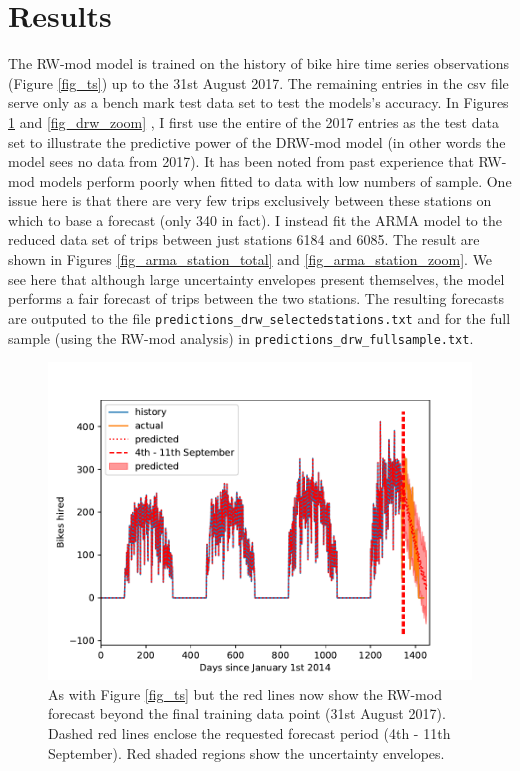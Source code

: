 \documentclass[10pt]{article}
\begin{document}
\section{Results}
\label{sec_results}
The RW-mod model is trained on the history of bike hire time series observations (Figure \ref{fig_ts}) up to the 31st August 2017. The remaining entries in the csv file serve only as a bench mark test data set to test the models's accuracy. In Figures \ref{fig_drw_total} and \ref{fig_drw_zoom} , I first use the entire of the 2017 entries as the test data set to illustrate the predictive power of the DRW-mod model (in other words the model sees no data from 2017). It has been noted from past experience that RW-mod models perform poorly when fitted to data with low numbers of sample. One issue here is that there are very few trips exclusively between these stations on which to base a forecast (only 340 in fact). I instead fit the ARMA model to the reduced data set of trips between just stations 6184 and 6085. The result are shown in Figures \ref{fig_arma_station_total} and \ref{fig_arma_station_zoom}. We see here that although large uncertainty envelopes present themselves, the model performs a fair forecast of trips between the two stations. The resulting forecasts are outputed to the file \verb|predictions_drw_selectedstations.txt| and for the full sample (using the RW-mod analysis) in \verb|predictions_drw_fullsample.txt|. 




\begin{figure}
\includegraphics[scale=1.0,angle=0,trim=0cm 0cm 0cm 0cm]{drw_total_ts.pdf}
\caption{As with Figure \ref{fig_ts} but the red lines now show the RW-mod forecast beyond the final training data point (31st August 2017). Dashed red lines enclose the requested forecast period (4th - 11th September). Red shaded regions show the uncertainty envelopes.}
\label{fig_drw_total}
\end{figure}
\end{document}
